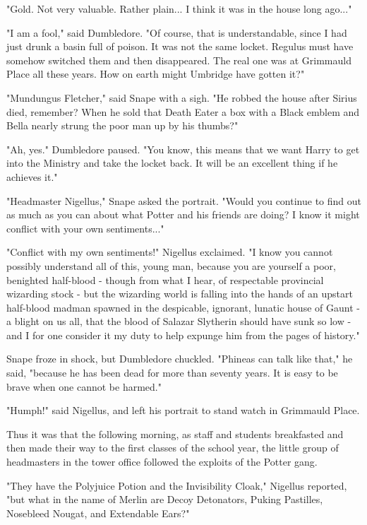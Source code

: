\documentclass[a4paper,11pt]{article}
\begin{document}
"Gold. Not very valuable. Rather plain... I think it was in the house long ago..."

"I am a fool," said Dumbledore. "Of course, that is understandable, since I had just drunk a basin full of poison. It was not the same locket. Regulus must have somehow switched them and then disappeared. The real one was at Grimmauld Place all these years. How on earth might Umbridge have gotten it?"

"Mundungus Fletcher," said Snape with a sigh. "He robbed the house after Sirius died, remember? When he sold that Death Eater a box with a Black emblem and Bella nearly strung the poor man up by his thumbs?"

"Ah, yes." Dumbledore paused. "You know, this means that we want Harry to get into the Ministry and take the locket back. It will be an excellent thing if he achieves it."

"Headmaster Nigellus," Snape asked the portrait. "Would you continue to find out as much as you can about what Potter and his friends are doing? I know it might conflict with your own sentiments..."

"Conflict with my own sentiments!" Nigellus exclaimed. "I know you cannot possibly understand all of this, young man, because you are yourself a poor, benighted half-blood - though from what I hear, of respectable provincial wizarding stock - but the wizarding world is falling into the hands of an upstart half-blood madman spawned in the despicable, ignorant, lunatic house of Gaunt - a blight on us all, that the blood of Salazar Slytherin should have sunk so low - and I for one consider it my duty to help expunge him from the pages of history."

Snape froze in shock, but Dumbledore chuckled. "Phineas can talk like that," he said, "because he has been dead for more than seventy years. It is easy to be brave when one cannot be harmed."

"Humph!" said Nigellus, and left his portrait to stand watch in Grimmauld Place.

Thus it was that the following morning, as staff and students breakfasted and then made their way to the first classes of the school year, the little group of headmasters in the tower office followed the exploits of the Potter gang.

"They have the Polyjuice Potion and the Invisibility Cloak," Nigellus reported, "but what in the name of Merlin are Decoy Detonators, Puking Pastilles, Nosebleed Nougat, and Extendable Ears?"
\end{document}
